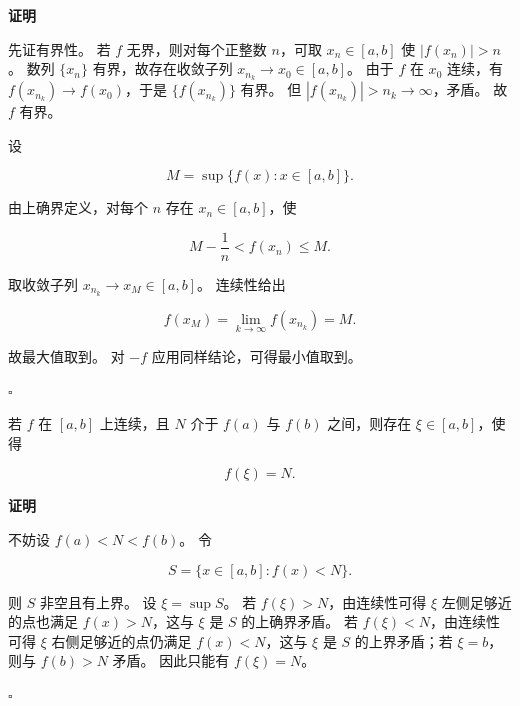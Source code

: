 \documentclass[fontset=fandol]{ctexart}
\newenvironment{proofdetail}{\par\noindent\textbf{证明}\quad}{\hfill$\square$\par\vspace{0.8em}}
\begin{document}
\begin{proofdetail}

先证有界性。 若 $f$ 无界，则对每个正整数 $n$，可取 $x_n\in[a,b]$ 使 $|f(x_n)|>n$。 数列 $\{x_n\}$ 有界，故存在收敛子列 $x_{n_k}\to x_0\in[a,b]$。 由于 $f$ 在 $x_0$ 连续，有 $f(x_{n_k})\to f(x_0)$，于是 $\{f(x_{n_k})\}$ 有界。 但 $|f(x_{n_k})|>n_k\to\infty$，矛盾。 故 $f$ 有界。



设

\[

M=\sup\{f(x):x\in[a,b]\}.

\]

由上确界定义，对每个 $n$ 存在 $x_n\in[a,b]$，使

\[

M-\frac1n<f(x_n)\le M.

\]

取收敛子列 $x_{n_k}\to x_M\in[a,b]$。 连续性给出

\[

f(x_M)=\lim_{k\to\infty}f(x_{n_k})=M.

\]

故最大值取到。 对 $-f$ 应用同样结论，可得最小值取到。

\end{proofdetail}



\begin{theorem}[介值定理]

若 $f$ 在 $[a,b]$ 上连续，且 $N$ 介于 $f(a)$ 与 $f(b)$ 之间，则存在 $\xi\in[a,b]$，使得

\[

f(\xi)=N.

\]

\end{theorem}

\begin{proofdetail}

不妨设 $f(a)<N<f(b)$。 令

\[

S=\{x\in[a,b]:f(x)<N\}.

\]

则 $S$ 非空且有上界。 设 $\xi=\sup S$。 若 $f(\xi)>N$，由连续性可得 $\xi$ 左侧足够近的点也满足 $f(x)>N$，这与 $\xi$ 是 $S$ 的上确界矛盾。 若 $f(\xi)<N$，由连续性可得 $\xi$ 右侧足够近的点仍满足 $f(x)<N$，这与 $\xi$ 是 $S$ 的上界矛盾；若 $\xi=b$，则与 $f(b)>N$ 矛盾。 因此只能有 $f(\xi)=N$。

\end{proofdetail}
\end{document}
